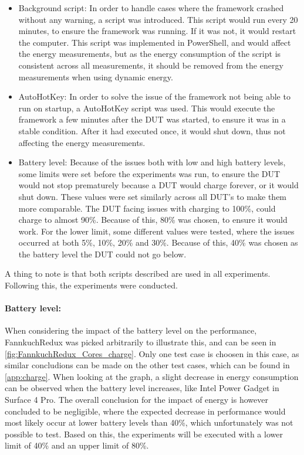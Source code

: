 \begin{itemize}
    \item Background script: In order to handle cases where the framework crashed without any warning, a script was introduced. This script would run every 20 minutes, to ensure the framework was running. If it was not, it would restart the computer. This script was implemented in PowerShell, and would affect the energy measurements, but as the energy consumption of the script is consistent across all measurements, it should be removed from the energy measurements when using dynamic energy.
    \item AutoHotKey: In order to solve the issue of the framework not being able to run on startup, a AutoHotKey script was used. This would execute the framework a few minutes after the DUT was started, to ensure it was in a stable condition. After it had executed once, it would shut down, thus not affecting the energy measurements.
    \item Battery level: Because of the issues both with low and high battery levels, some limits were set before the experiments was run, to ensure the DUT would not stop prematurely because a DUT would charge forever, or it would shut down. These values were set similarly across all DUT's to make them more comparable. The DUT facing issues with charging to 100\%, could charge to almost 90\%. Because of this, 80\% was chosen, to ensure it would work. For the lower limit, some different values were tested, where the issues occurred at both 5\%, 10\%, 20\% and 30\%. Because of this, 40\% was chosen as the battery level the DUT could not go below.
\end{itemize}

A thing to note is that both scripts described are used in all experiments. Following this, the experiments were conducted.



\paragraph{Battery level:} When considering the impact of the battery level on the performance, FannkuchRedux was picked arbitrarily to illustrate this, and can be seen in \cref{fig:FannkuchRedux_Cores_charge}. Only one test case is choosen in this case, as similar concludions can be made on the other test cases, which can be found in \cref{app:charge}. When looking at the graph, a slight decrease in energy consumption can be observed when the battery level increases, like Intel Power Gadget in Surface 4 Pro. The overall conclusion for the impact of energy is however concluded to be negligible, where the expected decrease in performance would most likely occur at lower battery levels than 40\%, which unfortunately was not possible to test. Based on this, the experiments will be executed with a lower limit of 40\% and an upper limit of 80\%.

